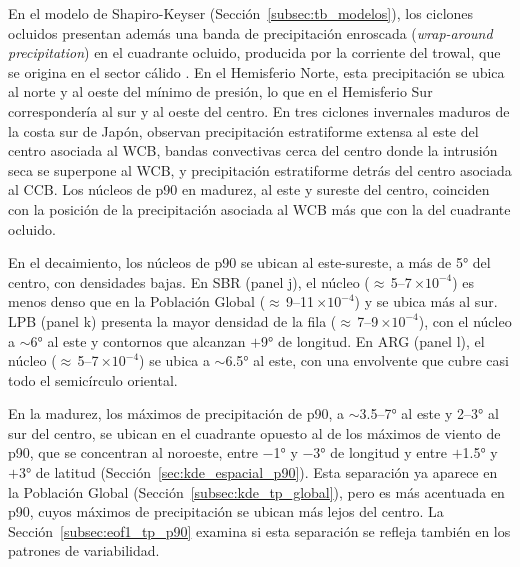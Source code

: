 
En el modelo de Shapiro-Keyser (Sección~\ref{subsec:tb_modelos}), los ciclones ocluidos presentan además una banda de precipitación enroscada (\textit{wrap-around precipitation}) en el cuadrante ocluido, producida por la corriente del trowal, que se origina en el sector cálido \citep{martin1999forcing}. En el Hemisferio Norte, esta precipitación se ubica al norte y al oeste del mínimo de presión, lo que en el Hemisferio Sur correspondería al sur y al oeste del centro. En tres ciclones invernales maduros de la costa sur de Japón, \citet{sawada2021heavy} observan precipitación estratiforme extensa al este del centro asociada al WCB, bandas convectivas cerca del centro donde la intrusión seca se superpone al WCB, y precipitación estratiforme detrás del centro asociada al CCB. Los núcleos de p90 en madurez, al este y sureste del centro, coinciden con la posición de la precipitación asociada al WCB más que con la del cuadrante ocluido.

En el decaimiento, los núcleos de p90 se ubican al este-sureste, a más de 5° del centro, con densidades bajas. En SBR (panel j), el núcleo (${\approx}$\,5--7\,$\times10^{-4}$) es menos denso que en la Población Global (${\approx}$\,9--11\,$\times10^{-4}$) y se ubica más al sur. LPB (panel k) presenta la mayor densidad de la fila (${\approx}$\,7--9\,$\times10^{-4}$), con el núcleo a ${\sim}$6° al este y contornos que alcanzan $+$9° de longitud. En ARG (panel l), el núcleo (${\approx}$\,5--7\,$\times10^{-4}$) se ubica a ${\sim}$6.5° al este, con una envolvente que cubre casi todo el semicírculo oriental.

En la madurez, los máximos de precipitación de p90, a ${\sim}$3.5--7° al este y 2--3° al sur del centro, se ubican en el cuadrante opuesto al de los máximos de viento de p90, que se concentran al noroeste, entre $-$1° y $-$3° de longitud y entre $+$1.5° y $+$3° de latitud (Sección~\ref{sec:kde_espacial_p90}). Esta separación ya aparece en la Población Global (Sección~\ref{subsec:kde_tp_global}), pero es más acentuada en p90, cuyos máximos de precipitación se ubican más lejos del centro. La Sección~\ref{subsec:eof1_tp_p90} examina si esta separación se refleja también en los patrones de variabilidad.
